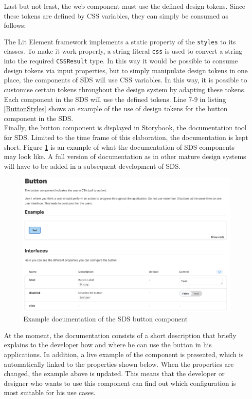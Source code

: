 Last but not least, the web component must use the defined design tokens. Since these tokens are defined by CSS variables, they can simply be consumed as follows: 

The Lit Element framework implements a static property of the \texttt{styles} to its classes. To make it work properly, a string literal \texttt{css} is used to convert a string into the required \texttt{CSSResult} type. In this way it would be possible to consume design tokens via input properties, but to simply manipulate design tokens in one place, the components of SDS will use CSS variables. In this way, it is possible to customise certain tokens throughout the design system by adapting these tokens. Each component in the SDS will use the defined tokens. Line 7-9 in listing \ref{ButtonStyles} shows an example of the use of design tokens for the button component in the SDS. \\
Finally, the button component is displayed in Storybook, the documentation tool for SDS. Limited to the time frame of this elaboration, the documentation is kept short. Figure \ref{storybook_button} is an example of what the documentation of SDS components may look like. A full version of documentation as in other mature design systems will have to be added in a subsequent development of SDS. \\
\begin{figure}[htbp]
    \centerline{\includegraphics[width=\linewidth]{images/storybook_button.png}}
    \caption{Example documentation of the SDS button component}
    \label{storybook_button}
\end{figure}
At the moment, the documentation consists of a short description that briefly explains to the developer how and where he can use the button in his applications. In addition, a live example of the component is presented, which is automatically linked to the properties shown below. When the properties are changed, the example above is updated. This means that the developer or designer who wants to use this component can find out which configuration is most suitable for his use cases. \\
